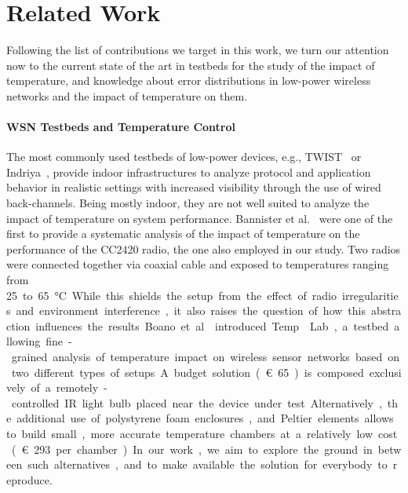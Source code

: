 \documentclass[color]{aib}
\begin{document}
\section{Related Work}

Following the list of contributions we target in this work, we turn our attention now to the current state of the art in testbeds for the study of the impact of temperature, and knowledge about error distributions in low-power wireless networks and the impact of temperature on them.

\paragraph{WSN Testbeds and Temperature Control}
The most commonly used testbeds of low-power devices, e.g., TWIST~\cite{twist} or Indriya~\cite{indriya}, provide indoor infrastructures to analyze protocol and application behavior in realistic settings with increased visibility through the use of wired back-channels.
Being mostly indoor, they are not well suited to analyze the impact of temperature on system performance.
Bannister et al.~\cite{bannister08hot} were one of the first to provide a systematic analysis of the impact of temperature on the performance of the CC2420 radio, the one also employed in our study.
Two radios were connected together via coaxial cable and exposed to temperatures ranging from \SI{25} to \SI{65}{\celsius}.
While this shields the setup from the effect of radio irregularities and environment interference, it also raises the question of how this abstraction influences the results.
Boano et al.~\cite{boano14templab} introduced Temp\-Lab, a testbed allowing fine-grained analysis of temperature impact on wireless sensor networks based on two different types of setups. 
A budget solution (\euro 65) is composed exclusively of a remotely-controlled IR light bulb placed near the device under test.
Alternatively, the additional use of polystyrene foam enclosures, and Peltier elements allows to build small, more accurate temperature chambers at a relatively low cost (\euro 293 per chamber).
In our work, we aim to explore the ground in between such alternatives, and to make available the solution for everybody to reproduce.
\end{document}
